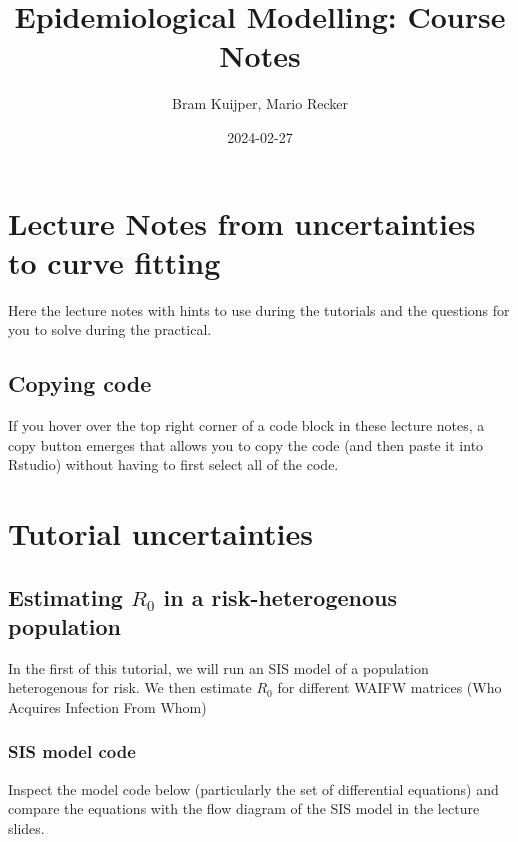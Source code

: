\documentclass[
]{book}
\title{Epidemiological Modelling: Course Notes}
\author{Bram Kuijper, Mario Recker}
\date{2024-02-27}
\theoremstyle{definition}
\theoremstyle{definition}
\theoremstyle{definition}
\theoremstyle{definition}
\theoremstyle{remark}
\begin{document}
\maketitle

{
\setcounter{tocdepth}{1}
\tableofcontents
}
\chapter{Lecture Notes from uncertainties to curve fitting}\label{lecture-notes-from-uncertainties-to-curve-fitting}

Here the lecture notes with hints to use during the tutorials and the questions for you to solve during the practical.

\section{}\label{section}

\section{Copying code}\label{copying-code}

If you hover over the top right corner of a code block in these lecture notes, a copy button emerges that allows
you to copy the code (and then paste it into Rstudio) without having to first select all of the code.

\chapter{Tutorial uncertainties}\label{tutorial-uncertainties}

\section{\texorpdfstring{Estimating \(R_{0}\) in a risk-heterogenous population}{Estimating R\_\{0\} in a risk-heterogenous population}}\label{estimating-r_0-in-a-risk-heterogenous-population}

In the first of this tutorial, we will run an SIS model
of a population heterogenous for risk. We then estimate \(R_{0}\) for different WAIFW matrices (Who Acquires Infection From Whom)

\subsection{SIS model code}\label{sis-model-code}

Inspect the model code below (particularly the set of
differential equations) and compare the equations with
the flow diagram of the SIS model in the lecture slides.
\end{document}
